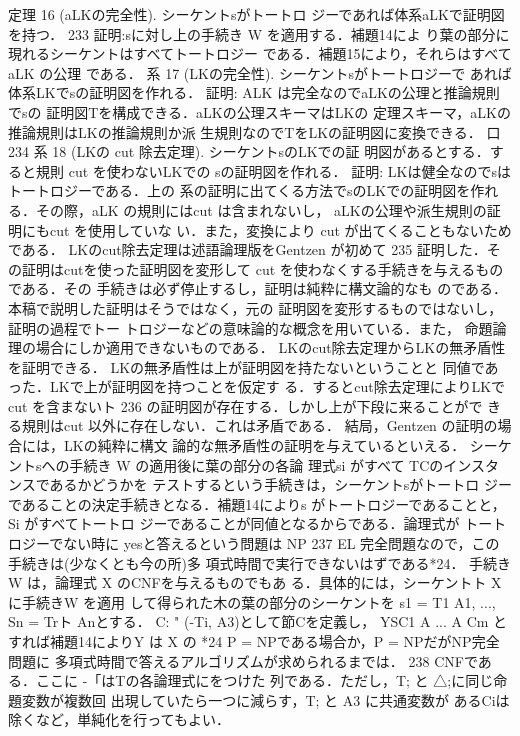 \documentclass{ltjsarticle}
\theoremstyle{mystyle1}
\theoremstyle{mystyle2}
\begin{document}
定理 16 (aLKの完全性). シーケントsがトートロ ジーであれば体系aLKで証明図を持つ．
233
証明:sに対し上の手続き W を適用する．補題14によ り葉の部分に現れるシーケントはすべてトートロジー である．補題15により，それらはすべてaLK の公理 である．
系 17 (LKの完全性). シーケントsがトートロジーで あれば体系LKでsの証明図を作れる．
証明: ALK は完全なのでaLKの公理と推論規則でsの 証明図Tを構成できる．aLKの公理スキーマはLKの 定理スキーマ，aLKの推論規則はLKの推論規則か派 生規則なのでTをLKの証明図に変換できる． 口
234
系 18 (LKの cut 除去定理). シーケントsのLKでの証 明図があるとする．すると規則 cut を使わないLKでの sの証明図を作れる．
証明: LKは健全なのでsはトートロジーである．上の 系の証明に出てくる方法でsのLKでの証明図を作れ
る．その際，aLK の規則にはcut は含まれないし， aLKの公理や派生規則の証明にもcut を使用していな い．また，変換により cut が出てくることもないため である．
LKのcut除去定理は述語論理版をGentzen が初めて
235
証明した．その証明はcutを使った証明図を変形して cut を使わなくする手続きを与えるものである．その 手続きは必ず停止するし，証明は純粋に構文論的なも のである．本稿で説明した証明はそうではなく，元の 証明図を変形するものではないし，証明の過程でトー トロジーなどの意味論的な概念を用いている．また， 命題論理の場合にしか適用できないものである． LKのcut除去定理からLKの無矛盾性を証明できる． LKの無矛盾性は上が証明図を持たないということと 同値であった．LKで上が証明図を持つことを仮定す
る．するとcut除去定理によりLKでcut を含まないト
236
の証明図が存在する．しかし上が下段に来ることがで きる規則はcut 以外に存在しない．これは矛盾である． 結局，Gentzen の証明の場合には，LKの純粋に構文 論的な無矛盾性の証明を与えているといえる． シーケントsへの手続き W の適用後に葉の部分の各論 理式si がすべて TCのインスタンスであるかどうかを テストするという手続きは，シーケントsがトートロ ジーであることの決定手続きとなる．補題14によりs がトートロジーであることと， Si がすべてトートロ ジーであることが同値となるからである．論理式が トートロジーでない時に yesと答えるという問題は NP
237
EL
完全問題なので，この手続きは(少なくとも今の所)多 項式時間で実行できないはずである*24． 手続き W は，論理式 X のCNFを与えるものでもあ る．具体的には，シーケントト Xに手続きW を適用 して得られた木の葉の部分のシーケントを s1 = T1 A1, ..., Sn = Trト Anとする． C: " (-Ti, A3)として節Cを定義し， YSC1 A ... A Cm とすれば補題14によりY は X の
*24 P = NPである場合か，P = NPだがNP完全問題に
多項式時間で答えるアルゴリズムが求められるまでは．
238
CNFである．ここに -「はTの各論理式にをつけた 列である．ただし，T; と △;に同じ命題変数が複数回 出現していたら一つに減らす，T; と A3 に共通変数が あるCiは除くなど，単純化を行ってもよい．
\end{document}
